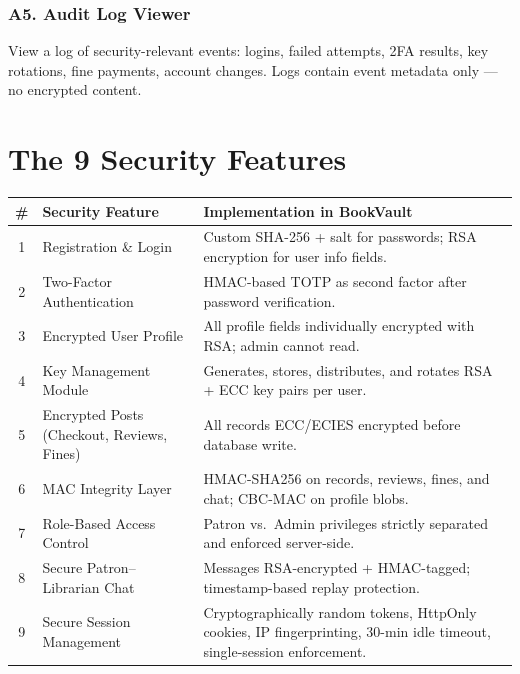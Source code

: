\documentclass[12pt]{article}
\begin{document}
\subsubsection{A5. Audit Log Viewer}
View a log of security-relevant events: logins, failed attempts, 2FA results, key rotations, fine payments, account changes. Logs contain event metadata only --- no encrypted content.

\section{The 9 Security Features}

\begin{center}
\renewcommand{\arraystretch}{1.4}
\begin{tabular}{c p{4.5cm} p{7.5cm}}
    \toprule
    \textbf{\#} & \textbf{Security Feature} & \textbf{Implementation in BookVault} \\
    \midrule
    1 & Registration \& Login & Custom SHA-256 + salt for passwords; RSA encryption for user info fields. \\
    2 & Two-Factor Authentication & HMAC-based TOTP as second factor after password verification. \\
    3 & Encrypted User Profile & All profile fields individually encrypted with RSA; admin cannot read. \\
    4 & Key Management Module & Generates, stores, distributes, and rotates RSA + ECC key pairs per user. \\
    5 & Encrypted Posts (Checkout, Reviews, Fines) & All records ECC/ECIES encrypted before database write. \\
    6 & MAC Integrity Layer & HMAC-SHA256 on records, reviews, fines, and chat; CBC-MAC on profile blobs. \\
    7 & Role-Based Access Control & Patron vs.\ Admin privileges strictly separated and enforced server-side. \\
    8 & Secure Patron--Librarian Chat & Messages RSA-encrypted + HMAC-tagged; timestamp-based replay protection. \\
    9 & Secure Session Management & Cryptographically random tokens, HttpOnly cookies, IP fingerprinting, 30-min idle timeout, single-session enforcement. \\
    \bottomrule
\end{tabular}
\end{center}

\end{document}
